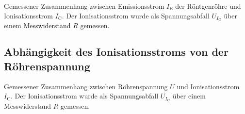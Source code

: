 \documentclass[11pt, a4paper]{article}
\numberwithin{equation}{section}
\begin{document}
\begin{appendix}
\begin{table}[hp]
	\vspace{10mm}
	
	\begin{subtable}[c]{0.75\textwidth}
		
		\label{tab:emissionsstrom_cu}
	\end{subtable}	
	\caption{Gemessener Zusammenhang zwischen Emissionsstrom $I_\mathrm{E}$ der Röntgenröhre und Ionisationsstrom $I_\mathrm{C}$. Der Ionisationsstrom wurde als Spannungsabfall $U_{I_\mathrm{C}}$ über einem Messwiderstand $R$ gemessen.}
\end{table}
\FloatBarrier

\subsection{Abhängigkeit des Ionisationsstroms von der Röhrenspannung}
\label{app:ionisationsstrom_roehrenspannung}
\begin{table}[hp]
	\centering
	\begin{subtable}[c]{0.75\textwidth}
		
		\label{tab:roehrenspannung_mo}
	\end{subtable}
	
	\vspace{10mm}
	
	\begin{subtable}[c]{0.75\textwidth}
		
		\label{tab:roehrenspannung_cu}
	\end{subtable}	
	\caption{Gemessener Zusammenhang zwischen Röhrenspannung $U$ und Ionisationsstrom $I_\mathrm{C}$. Der Ionisationsstrom wurde als Spannungsabfall $U_{I_\mathrm{C}}$ über einem Messwiderstand $R$ gemessen.}
\end{table}
\FloatBarrier

\end{appendix}
\end{document}
